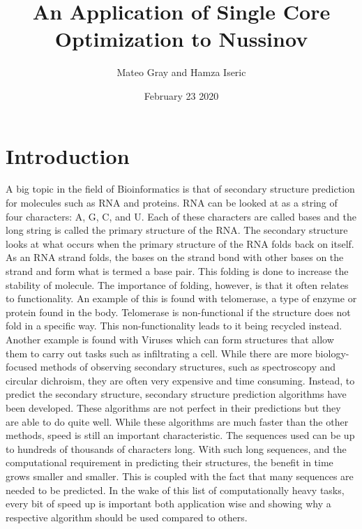 \documentclass{article}
\title{An Application of Single Core Optimization to Nussinov }
\author{Mateo Gray and Hamza Iseric }
\date{February 23 2020}
\begin{document}
\maketitle

\section{Introduction}

A big topic in the field of Bioinformatics is that of secondary structure prediction for molecules such as RNA and proteins. RNA can be looked at as a string of four characters: A, G, C, and U. Each of these characters are called bases and the long string is called the primary structure of the RNA. The secondary structure looks at what occurs when the primary structure of the RNA folds back on itself. As an RNA strand folds, the bases on the strand bond with other bases on the strand and form what is termed a base pair. This folding is done to increase the stability of molecule. The importance of folding, however, is that it often relates to functionality. An example of this is found with telomerase, a type of enzyme or protein found in the body. Telomerase is non-functional if the structure does not fold in a specific way. This non-functionality leads to it being recycled instead. Another example is found with Viruses which can form structures that allow them to carry out tasks such as infiltrating a cell. While there are more biology-focused methods of observing secondary structures, such as spectroscopy and circular dichroism, they are often very expensive and time consuming. Instead, to predict the secondary structure, secondary structure prediction algorithms have been developed. These algorithms are not perfect in their predictions but they are able to do quite well. While these algorithms are much faster than the other methods, speed is still an important characteristic. The sequences used can be up to hundreds of thousands of characters long. With such long sequences, and the computational requirement in predicting their structures, the benefit in time grows smaller and smaller. This is coupled with the fact that many sequences are needed to be predicted. In the wake of this list of computationally heavy tasks, every bit of speed up is important both application wise and showing why a respective algorithm should be used compared to others.
\end{document}
